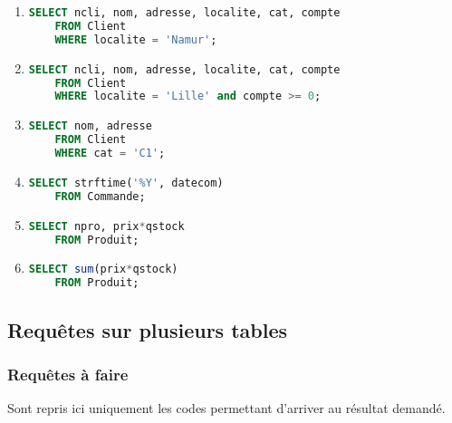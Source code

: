 \documentclass{article}
\begin{document}
\begin{enumerate}
    \item
    \begin{lstlisting}[language=SQL]
    SELECT ncli, nom, adresse, localite, cat, compte
    FROM Client
    WHERE localite = 'Namur'; \end{lstlisting}

    \item
    \begin{lstlisting}[language=SQL]
    SELECT ncli, nom, adresse, localite, cat, compte
    FROM Client
    WHERE localite = 'Lille' and compte >= 0; \end{lstlisting}

    \item
    \begin{lstlisting}[language=SQL]
    SELECT nom, adresse
    FROM Client
    WHERE cat = 'C1'; \end{lstlisting}

    \item
    \begin{lstlisting}[language=SQL]
    SELECT strftime('%Y', datecom)
    FROM Commande; \end{lstlisting}

    \item
    \begin{lstlisting}[language=SQL]
    SELECT npro, prix*qstock
    FROM Produit; \end{lstlisting}

    \item
    \begin{lstlisting}[language=SQL]
    SELECT sum(prix*qstock)
    FROM Produit; \end{lstlisting}
\end{enumerate}

\subsection{Requêtes sur plusieurs tables}
\subsubsection{Requêtes à faire}

    Sont repris ici uniquement les codes permettant d'arriver au résultat demandé.
\end{document}
